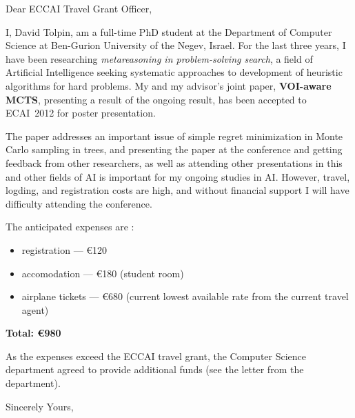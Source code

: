 \documentclass[11pt]{letter}
\begin{document}
\begin{letter}{}
\opening{Dear ECCAI Travel Grant Officer,}

I, David Tolpin, am a full-time PhD student at the Department of
Computer Science at Ben-Gurion University of the Negev, Israel. For the last
three years, I have been researching {\it metareasoning in
  problem-solving search}, a field of Artificial Intelligence seeking
systematic approaches to development of heuristic algorithms for hard
problems. My and my advisor's joint paper, {\bf VOI-aware MCTS},
presenting a result of the ongoing result, has been accepted to
ECAI~2012 for poster presentation.

The paper addresses an important issue of simple regret minimization
in Monte Carlo sampling in trees, and presenting the paper at the
conference and getting feedback from other researchers,
as well as attending other presentations in this and other fields of
AI is important for my ongoing studies in AI. However, travel,
logding, and registration costs are high, and without financial 
support I will have difficulty attending the conference.

The anticipated expenses are :

\begin{itemize}
\item registration --- \euro{120}
\item accomodation --- \euro{180} (student room)
\item airplane tickets --- \euro{680} (current lowest available rate
  from the current travel agent)
\end{itemize}

{\bf Total: \euro{980}}

As the expenses exceed the ECCAI travel grant, the Computer Science
department agreed to provide additional funds (see the letter from the 
department).

\closing{Sincerely Yours,}

\end{letter}
\end{document}

